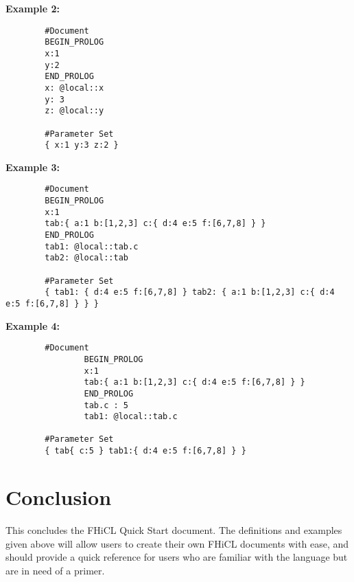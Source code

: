 \documentclass{memarticle}
\begin{document}
	\textbf{Example 2:}
	\begin{verbatim}
		#Document
		BEGIN_PROLOG
		x:1
		y:2
		END_PROLOG
		x: @local::x
		y: 3
		z: @local::y
	
		#Parameter Set
		{ x:1 y:3 z:2 }
	\end{verbatim}

	\textbf{Example 3:}
	\begin{verbatim}
		#Document
		BEGIN_PROLOG
		x:1
		tab:{ a:1 b:[1,2,3] c:{ d:4 e:5 f:[6,7,8] } }
		END_PROLOG
		tab1: @local::tab.c
		tab2: @local::tab

		#Parameter Set
		{ tab1: { d:4 e:5 f:[6,7,8] } tab2: { a:1 b:[1,2,3] c:{ d:4 e:5 f:[6,7,8] } } }
	\end{verbatim}

	\textbf{Example 4:}
	\begin{verbatim}
		#Document
                BEGIN_PROLOG
                x:1
                tab:{ a:1 b:[1,2,3] c:{ d:4 e:5 f:[6,7,8] } }
                END_PROLOG
                tab.c : 5
                tab1: @local::tab.c

		#Parameter Set
		{ tab{ c:5 } tab1:{ d:4 e:5 f:[6,7,8] } }

	\end{verbatim}
\chapter{Conclusion}
	This concludes the FHiCL Quick Start document. 
	The definitions and examples given above will allow users to create their own FHiCL documents with ease,
	and should provide a quick reference for users who are familiar with the language but are in need of a primer.
\end{document}
